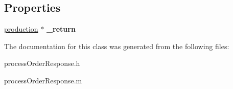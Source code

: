 \subsection*{Properties}
\begin{DoxyCompactItemize}
\item 
\hypertarget{interfaceprocess_order_response_a6d41a226b4468722152894f71c5b61f9}{}\hyperlink{interfaceproduction}{production} $\ast$ {\bfseries \+\_\+return}\label{interfaceprocess_order_response_a6d41a226b4468722152894f71c5b61f9}

\end{DoxyCompactItemize}


The documentation for this class was generated from the following files\+:\begin{DoxyCompactItemize}
\item 
process\+Order\+Response.\+h\item 
process\+Order\+Response.\+m\end{DoxyCompactItemize}
